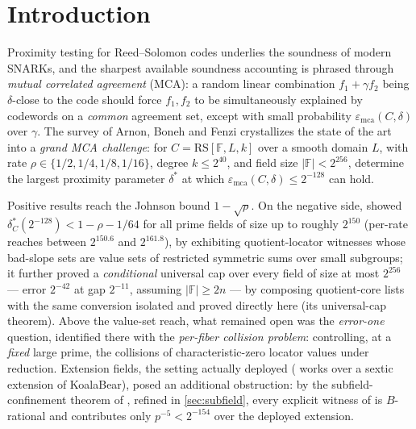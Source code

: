 \documentclass[11pt]{article}
\theoremstyle{definition}
\theoremstyle{remark}
\newcommand{\F}{\mathbb{F}}
\newcommand{\B}{B}
\newcommand{\RS}{\mathrm{RS}}
\newcommand{\emca}{\varepsilon_{\mathrm{mca}}}
\begin{document}
\begin{abstract}
outside the same band; a sound staircase scanner is specified and run on the deployed rows; and every ECFFT row acquires an unsafe first staircase step. The grand MCA threshold of every deployed row is thereby pinned between $(1-\rho)/3$ and the printed capacity gap --- known up to a factor of three --- and the residue of the entire program is a single aperiodic band conjecture.
\end{abstract}

\section{Introduction}\label{sec:intro}

Proximity testing for Reed--Solomon codes underlies the soundness of modern SNARKs, and the sharpest available soundness accounting is phrased through \emph{mutual correlated agreement} (MCA): a random linear combination $f_1+\gamma f_2$ being $\delta$-close to the code should force $f_1,f_2$ to be simultaneously explained by codewords on a \emph{common} agreement set, except with small probability $\emca(C,\delta)$ over $\gamma$. The survey of Arnon, Boneh and Fenzi \cite{ABF26} crystallizes the state of the art into a \emph{grand MCA challenge}: for $C=\RS[\F,L,k]$ over a smooth domain $L$, with rate $\rho\in\{1/2,1/4,1/8,1/16\}$, degree $k\le2^{40}$, and field size $|\F|<2^{256}$, determine the largest proximity parameter $\delta^*$ at which $\emca(C,\delta)\le2^{-128}$ can hold.

Positive results reach the Johnson bound $1-\sqrt\rho$. On the negative side, \cite{Cho26b} showed $\delta^*_C(2^{-128})<1-\rho-1/64$ for all prime fields of size up to roughly $2^{150}$ (per-rate reaches between $2^{150.6}$ and $2^{161.8}$), by exhibiting quotient-locator witnesses whose bad-slope sets are value sets of restricted symmetric sums over small subgroups; it further proved a \emph{conditional} universal cap over every field of size at most $2^{256}$ --- error $2^{-42}$ at gap $2^{-11}$, assuming $|\F|\ge2n$ --- by composing quotient-core lists with the same conversion isolated and proved directly here (its universal-cap theorem). Above the value-set reach, what remained open was the \emph{error-one} question, identified there with the \emph{per-fiber collision problem}: controlling, at a \emph{fixed} large prime, the collisions of characteristic-zero locator values under reduction. Extension fields, the setting actually deployed (\cite[\S6.3]{ABF26} works over a sextic extension of KoalaBear), posed an additional obstruction: by the subfield-confinement theorem of \cite{Cho26b}, refined in \cref{sec:subfield}, every explicit witness of \cite{Cho26a,Cho26b} is $\B$-rational and contributes only $p^{-5}<2^{-154}$ over the deployed extension.
\end{document}
